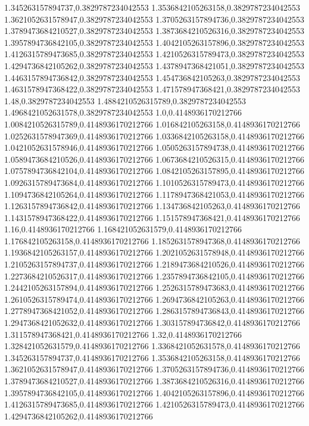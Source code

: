 1.345263157894737,0.3829787234042553
1.3536842105263158,0.3829787234042553
1.3621052631578947,0.3829787234042553
1.3705263157894736,0.3829787234042553
1.3789473684210527,0.3829787234042553
1.3873684210526316,0.3829787234042553
1.3957894736842105,0.3829787234042553
1.4042105263157896,0.3829787234042553
1.4126315789473685,0.3829787234042553
1.4210526315789473,0.3829787234042553
1.4294736842105262,0.3829787234042553
1.4378947368421051,0.3829787234042553
1.4463157894736842,0.3829787234042553
1.454736842105263,0.3829787234042553
1.4631578947368422,0.3829787234042553
1.471578947368421,0.3829787234042553
1.48,0.3829787234042553
1.4884210526315789,0.3829787234042553
1.4968421052631578,0.3829787234042553
1.0,0.4148936170212766
1.0084210526315789,0.4148936170212766
1.016842105263158,0.4148936170212766
1.0252631578947369,0.4148936170212766
1.0336842105263158,0.4148936170212766
1.0421052631578946,0.4148936170212766
1.0505263157894738,0.4148936170212766
1.0589473684210526,0.4148936170212766
1.0673684210526315,0.4148936170212766
1.0757894736842104,0.4148936170212766
1.0842105263157895,0.4148936170212766
1.0926315789473684,0.4148936170212766
1.1010526315789473,0.4148936170212766
1.1094736842105264,0.4148936170212766
1.1178947368421053,0.4148936170212766
1.1263157894736842,0.4148936170212766
1.134736842105263,0.4148936170212766
1.1431578947368422,0.4148936170212766
1.151578947368421,0.4148936170212766
1.16,0.4148936170212766
1.168421052631579,0.4148936170212766
1.176842105263158,0.4148936170212766
1.1852631578947368,0.4148936170212766
1.1936842105263157,0.4148936170212766
1.2021052631578948,0.4148936170212766
1.2105263157894737,0.4148936170212766
1.2189473684210526,0.4148936170212766
1.2273684210526317,0.4148936170212766
1.2357894736842105,0.4148936170212766
1.2442105263157894,0.4148936170212766
1.2526315789473683,0.4148936170212766
1.2610526315789474,0.4148936170212766
1.2694736842105263,0.4148936170212766
1.2778947368421052,0.4148936170212766
1.2863157894736843,0.4148936170212766
1.2947368421052632,0.4148936170212766
1.303157894736842,0.4148936170212766
1.311578947368421,0.4148936170212766
1.32,0.4148936170212766
1.328421052631579,0.4148936170212766
1.3368421052631578,0.4148936170212766
1.345263157894737,0.4148936170212766
1.3536842105263158,0.4148936170212766
1.3621052631578947,0.4148936170212766
1.3705263157894736,0.4148936170212766
1.3789473684210527,0.4148936170212766
1.3873684210526316,0.4148936170212766
1.3957894736842105,0.4148936170212766
1.4042105263157896,0.4148936170212766
1.4126315789473685,0.4148936170212766
1.4210526315789473,0.4148936170212766
1.4294736842105262,0.4148936170212766
